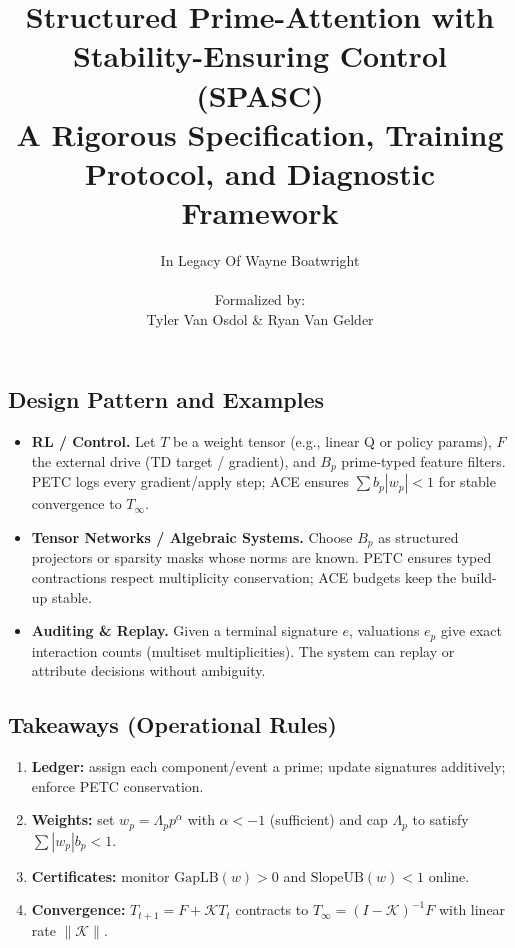 \documentclass[11pt]{article}
\theoremstyle{definition}
\theoremstyle{remark}
\newcommand{\1}{\mathbf{1}}
\begin{document}
\subsection{Design Pattern and Examples}
\begin{itemize}
  \item \textbf{RL / Control.} Let $T$ be a weight tensor (e.g., linear Q or policy params), $F$ the external drive
        (TD target / gradient), and $B_p$ prime-typed feature filters. PETC logs every gradient/apply step; ACE ensures
        $\sum b_p |w_p| < 1$ for stable convergence to $T_\infty$.
  \item \textbf{Tensor Networks / Algebraic Systems.} Choose $B_p$ as structured projectors or sparsity masks whose norms
        are known. PETC ensures typed contractions respect multiplicity conservation; ACE budgets keep the build-up stable.
  \item \textbf{Auditing \& Replay.} Given a terminal signature $e$, valuations $e_p$ give exact interaction counts
        (multiset multiplicities). The system can replay or attribute decisions without ambiguity.
\end{itemize}

\subsection{Takeaways (Operational Rules)}
\begin{enumerate}
  \item \textbf{Ledger:} assign each component/event a prime; update signatures additively; enforce PETC conservation.
  \item \textbf{Weights:} set $w_p=\Lambda_p p^\alpha$ with $\alpha< -1$ (sufficient) and cap $\Lambda_p$ to satisfy
        $\sum |w_p| b_p < 1$.
  \item \textbf{Certificates:} monitor $\mathrm{GapLB}(w)>0$ and $\mathrm{SlopeUB}(w)<1$ online.
  \item \textbf{Convergence:} $T_{t+1}=F+\mathcal{K}T_t$ contracts to $T_\infty=(I-\mathcal{K})^{-1}F$ with linear rate $\|\mathcal{K}\|$.
\end{enumerate}
\title{Structured Prime-Attention with Stability-Ensuring Control (SPASC)\\\large A Rigorous Specification, Training Protocol, and Diagnostic Framework}
\author{\normalsize In Legacy Of Wayne Boatwright \\ \\ Formalized by: \\ Tyler Van Osdol \& Ryan Van Gelder}
\end{document}
